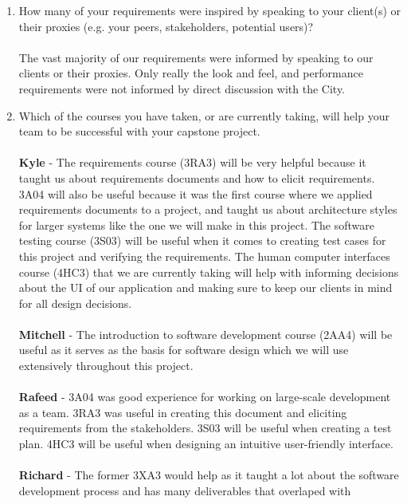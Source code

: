 \documentclass[12pt]{article}
\begin{document}
\begin{enumerate}
    \item How many of your requirements were inspired by speaking to your
      client(s) or their proxies (e.g. your peers, stakeholders,
      potential users)? \\
      \\
      The vast majority of our requirements were informed by speaking
      to our clients or their proxies. Only really the look and feel,
      and performance requirements were not informed by direct
      discussion with the City. \\
    \item Which of the courses you have taken, or are currently taking,
      will help your team to be successful with your capstone project. \\
      \\
      \textbf{Kyle} - The requirements course (3RA3) will be very
      helpful because it taught us about requirements documents and how
      to elicit requirements. 3A04 will also be useful because it was
      the first course where we applied requirements documents to a
      project, and taught us about architecture styles for larger
      systems like the one we will make in this project. The software
      testing course (3S03) will be useful when it comes to creating
      test cases for this project and verifying the requirements. The
      human computer interfaces course (4HC3) that we are currently
      taking will help with informing decisions about the UI of our
      application and making sure to keep our clients in mind for all
      design decisions.\\
      \\
      \textbf{Mitchell} - The introduction to software development
      course (2AA4) will be useful as it serves as the basis for
      software design which we will use extensively throughout this project.\\
      \\
      \textbf{Rafeed} - 3A04 was good experience for working on
      large-scale development as a team. 3RA3 was useful in creating
      this document and eliciting requirements from the stakeholders.
      3S03 will be useful when creating a test plan. 4HC3 will be
      useful when designing an intuitive user-friendly interface. \\
      \\
      \textbf{Richard} - The former 3XA3 would help as it taught a lot about the
      software development process and has many deliverables that overlaped with

\end{enumerate}
\end{document}
